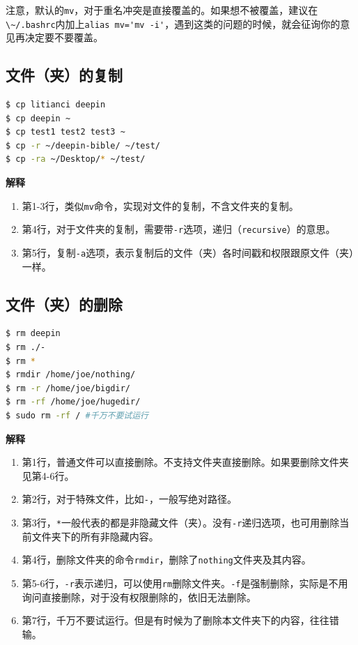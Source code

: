 \documentclass[doctor,openright,twoside]{sjtuthesis}
\providecommand{\tightlist}{%
    \setlength{\itemsep}{0pt}\setlength{\parskip}{0pt}}
\newcommand{\passthrough}[1]{#1}
\theoremstyle{plain}
\theoremstyle{definition}
\theoremstyle{remark}
\theoremstyle{ocrenumbox}
\theoremstyle{plain}
\begin{document}
注意，默认的\passthrough{\lstinline!mv!}，对于重名冲突是直接覆盖的。如果想不被覆盖，建议在\passthrough{\lstinline!\~/.bashrc!}内加上\passthrough{\lstinline!alias mv='mv -i'!}，遇到这类的问题的时候，就会征询你的意见再决定要不要覆盖。

\hypertarget{section-72}{%
\subsection{文件（夹）的复制}\label{section-72}}

\begin{lstlisting}[language=bash]
$ cp litianci deepin
$ cp deepin ~
$ cp test1 test2 test3 ~
$ cp -r ~/deepin-bible/ ~/test/
$ cp -ra ~/Desktop/* ~/test/
\end{lstlisting}

\textbf{解释}

\begin{enumerate}
\def\labelenumi{\arabic{enumi}.}
\tightlist
\item
  第1-3行，类似\passthrough{\lstinline!mv!}命令，实现对文件的复制，不含文件夹的复制。
\item
  第4行，对于文件夹的复制，需要带\passthrough{\lstinline!-r!}选项，递归（\passthrough{\lstinline!recursive!}）的意思。
\item
  第5行，复制\passthrough{\lstinline!-a!}选项，表示复制后的文件（夹）各时间戳和权限跟原文件（夹）一样。
\end{enumerate}

\hypertarget{section-73}{%
\subsection{文件（夹）的删除}\label{section-73}}

\begin{lstlisting}[language=bash]
$ rm deepin
$ rm ./-
$ rm *
$ rmdir /home/joe/nothing/
$ rm -r /home/joe/bigdir/
$ rm -rf /home/joe/hugedir/
$ sudo rm -rf / #千万不要试运行
\end{lstlisting}

\textbf{解释}

\begin{enumerate}
\def\labelenumi{\arabic{enumi}.}
\tightlist
\item
  第1行，普通文件可以直接删除。不支持文件夹直接删除。如果要删除文件夹见第4-6行。
\item
  第2行，对于特殊文件，比如\passthrough{\lstinline!-!}，一般写绝对路径。
\item
  第3行，\passthrough{\lstinline!*!}一般代表的都是非隐藏文件（夹）。没有\passthrough{\lstinline!-r!}递归选项，也可用删除当前文件夹下的所有非隐藏内容。
\item
  第4行，删除文件夹的命令\passthrough{\lstinline!rmdir!}，删除了\passthrough{\lstinline!nothing!}文件夹及其内容。
\item
  第5-6行，\passthrough{\lstinline!-r!}表示递归，可以使用\passthrough{\lstinline!rm!}删除文件夹。\passthrough{\lstinline!-f!}是强制删除，实际是不用询问直接删除，对于没有权限删除的，依旧无法删除。
\item
  第7行，千万不要试运行。但是有时候为了删除本文件夹下的内容，往往错输。
\end{enumerate}
\end{document}
